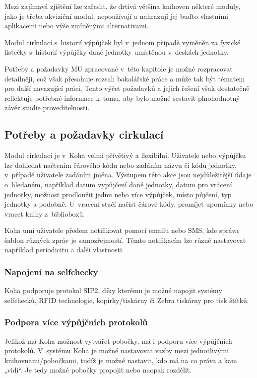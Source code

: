 \documentclass[
	11pt, oneside, printed, draft, 
	table,   %
	lof,     %
	lot     %
]{fithesis3}
\begin{document}
{Mezi zajímavá zjištění lze zařadit, že drtivá většina knihoven některé moduly, jako je třeba akviziční modul, nepoužívají a nahrazují jej buďto vlastními aplikacemi nebo výše zmíněnými alternativami.

Modul cirkulací s~historií výpůjček byl v~jednom případě vyměněn za fyzické lístečky s~historií výpůjčky dané jednotky umístěnou v~deskách jednotky. 

Potřeby a požadavky MU zpracované v~této kapitole je možné rozpracovat detailněji, což však přesahuje rozsah bakalářské práce a může tak být tématem pro další navazující práci. Tento výčet požadavků a jejich řešení však dostatečně reflektuje potřebné informace k~tomu, aby bylo možné sestavit plnohodnotný závěr studie proveditelnosti.

\subsection{Potřeby a požadavky cirkulací}

Modul cirkulací je v~Koha velmi přívětivý a flexibilní. Uživatele nebo výpůjčku lze dohledat načtením čárového kódu nebo zadáním názvu či kódu jednotky, v~případě uživatele zadáním jména. Výstupem této akce jsou nejdůležitější údaje o~hledaném, například datum vypůjčení dané jednotky, datum pro vrácení jednotky, možnost prodloužit jednu nebo více výpůjček, místo půjčení, typ jednotky a podobně. U~vracení stačí načíst čárové kódy, promíjet upomínky nebo vracet knihy z~biblioboxů.


Koha umí uživatele předem notifikovat pomocí emailu nebo SMS, kde správa šablon různých zpráv je samozřejmostí. Těmto notifikacím lze různě nastavovat například periodicitu a další vlastnosti.

\subsubsection{Napojení na selfchecky}
Koha podporuje protokol SIP2, díky kterému je možné napojit systémy selfchecků, RFID technologie, kopírky/tiskárny či Zebra tiskárny pro tisk štítků.%

\subsubsection{Podpora více výpůjčních protokolů}
Jelikož má Koha možnost vytvářet pobočky, má i podporu více výpůjčních protokolů. V~systému Koha je možné nastavovat vazby mezi jednotlivými knihovnami/pobočkami, tudíž je možné nastavit, kdo má na co práva a kam „vidí“. Je tedy možné pobočky propojit nebo naopak rozdělit.

}
\end{document}
